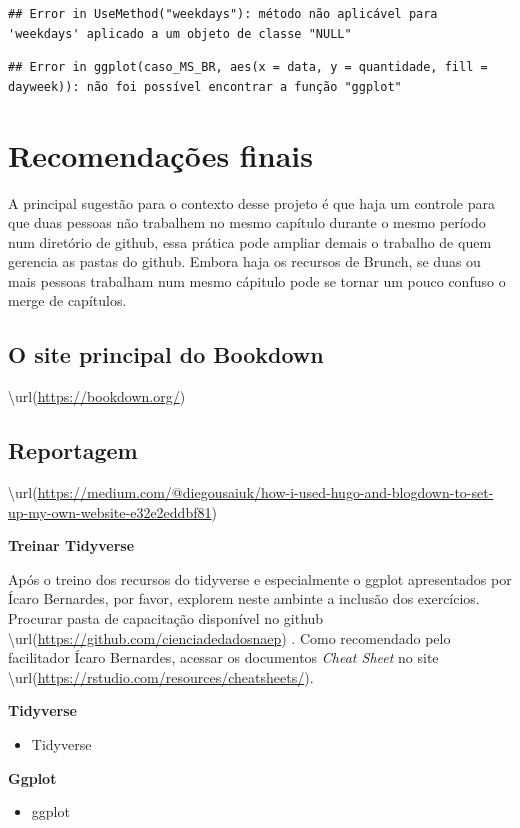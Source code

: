 \documentclass[
  oneside]{book}
\providecommand{\tightlist}{%
  \setlength{\itemsep}{0pt}\setlength{\parskip}{0pt}}
\begin{document}
\begin{verbatim}
## Error in UseMethod("weekdays"): método não aplicável para 'weekdays' aplicado a um objeto de classe "NULL"
\end{verbatim}

\begin{verbatim}
## Error in ggplot(caso_MS_BR, aes(x = data, y = quantidade, fill = dayweek)): não foi possível encontrar a função "ggplot"
\end{verbatim}

\hypertarget{recomendauxe7uxf5es-finais}{%
\chapter{Recomendações finais}\label{recomendauxe7uxf5es-finais}}

A principal sugestão para o contexto desse
projeto é que haja um controle para que duas
pessoas não trabalhem no mesmo capítulo
durante o mesmo período num diretório de
github, essa prática pode ampliar demais o
trabalho de quem gerencia as pastas do
github. Embora haja os recursos de Brunch,
se duas ou mais pessoas trabalham num mesmo
cápitulo pode se tornar um pouco confuso o
merge de capítulos.

\hypertarget{o-site-principal-do-bookdown}{%
\section{O site principal do Bookdown}\label{o-site-principal-do-bookdown}}

\textbackslash url(\url{https://bookdown.org/})

\hypertarget{reportagem}{%
\section{Reportagem}\label{reportagem}}

\textbackslash url(\url{https://medium.com/@diegousaiuk/how-i-used-hugo-and-blogdown-to-set-up-my-own-website-e32e2eddbf81})

\textbf{Treinar Tidyverse}

Após o treino dos recursos do tidyverse e
especialmente o ggplot apresentados por
Ícaro Bernardes, por favor,
explorem neste ambinte a inclusão dos exercícios.
Procurar pasta de capacitação disponível no github
\textbackslash url(\url{https://github.com/cienciadedadosnaep}) .
Como recomendado pelo facilitador Ícaro Bernardes,
acessar os documentos \emph{Cheat Sheet} no site
\textbackslash url(\url{https://rstudio.com/resources/cheatsheets/}).

\textbf{Tidyverse}

\begin{itemize}
\tightlist
\item
  Tidyverse
\end{itemize}

\textbf{Ggplot}

\begin{itemize}
\tightlist
\item
  ggplot
\end{itemize}

  
\end{document}
